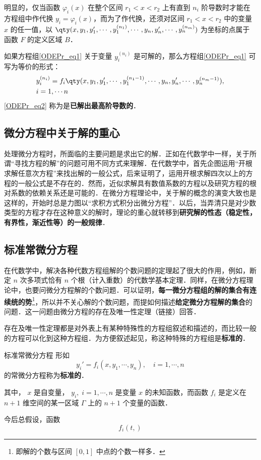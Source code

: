 明显的，仅当函数 $\varphi_i(x)$ 在整个区间 $r_1<x<r_2$ 上有直到 $n_i$ 阶导数时才能在方程组中作代换 $y_i=\varphi_i(x)$，而为了作代换，还须对区间 $r_1<x<r_2$ 中的变量 $x$ 的任一值，以 $\qty(x,y_1,y_1',\cdots,y_1^{(n_1)},\cdots,y_n,y_n',\cdots,y_n^{(n_m)})$ 为坐标的点属于函数 $F$ 的定义区域 $B$．

如果方程组\autoref{ODEPr_eq1} 关于变量 $y_i^{(n_i)}$ 是可解的，那么方程组\autoref{ODEPr_eq1} 可写为等价的形式： 
\begin{equation}\label{ODEPr_eq2}
\begin{aligned}
&y_i^{(n_i)}=f_i\qty(x,y_1,y_1',\cdots,y_1^{(n_1-1)},\cdots,y_n,y_n',\cdots,y_n^{(n_m-1)}),\\
& i=1,\cdots n
\end{aligned}
\end{equation}
\autoref{ODEPr_eq2} 称为是\textbf{已解出最高阶导数的}．
\subsection{微分方程中关于解的重心}
处理微分方程时，所面临的主要问题是求出它的解．正如在代数学中一样，关于所谓“寻找方程的解”的问题可用不同方式来理解．在代数学中，首先企图运用“开根求解任意次方程”来找出解的一般公式，后来证明了，运用开根求解四次以上的方程的一般公式是不存在的．然而，近似求解具有数值系数的方程以及研究方程的根对系数的依赖关系还是可能的．在微分方程理论中，关于解的概念的演变大致也是这样的，开始时总是力图以“求积方式积分出微分方程”．以后，当弄清只是对少数类型的方程才存在这种意义的解时，理论的重心就转移到\textbf{研究解的性态（稳定性，有界性，渐近性等）的一般规律}．
\subsection{标准常微分方程}
在代数学中，解决各种代数方程组解的个数问题的定理起了很大的作用，例如，断定 $n$ 次多项式恰有 $n$ 个根（计入重数）的代数学基本定理．同样，在微分方程理论中，也要问微分方程解的个数问题．可以证明，\textbf{每一微分方程组的解的集合有连续统的势}\footnote{即解的个数与区间 $[0,1]$ 中点的个数一样多．}，所以并不关心解的个数问题，而提如何描述\textbf{给定微分方程解的集合}的问题．这一问题由微分方程的存在及唯一性定理（链接）回答．

存在及唯一性定理都是对外表上有某种特殊性的方程组叙述和描述的，而比较一般的方程可以化到这种方程组．为方便叙述起见，称这种特殊的方程组是\textbf{标准的}．

\begin{definition}{标准常微分方程}
形如
\begin{equation}
y_i'=f_i(x,y_1,\cdots,y_n),\quad i=1,\cdots,n
\end{equation}
的常微分方程称为\textbf{标准的}．

其中， $x$ 是自变量， $y_i,\; i=1,\cdots, n$ 是变量 $x$ 的未知函数，而函数 $f_i$ 是定义在 $n+1$ 维空间的某一区域 $\Gamma$ 上的 $n+1$ 个变量的函数．
\end{definition}

今后总假设，函数 
\begin{equation}
f_i(t,)
\end{equation}


